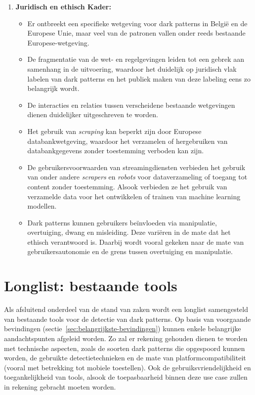 \begin{enumerate}
    \item \textbf{Juridisch en ethisch Kader:}
    \begin{itemize}
        \item Er ontbreekt een specifieke wetgeving voor dark patterns in België en de Europese Unie, maar veel van de patronen vallen onder reeds bestaande Europese-wetgeving.
        \item De fragmentatie van de wet- en regelgevingen leiden tot een gebrek aan samenhang in de uitvoering, waardoor het duidelijk op juridisch vlak labelen van dark patterns en het publiek maken van deze labeling eens zo belangrijk wordt.
        \item De interacties en relaties tussen verscheidene bestaande wetgevingen dienen duidelijker uitgeschreven te worden.
        \item Het gebruik van \textit{scraping} kan beperkt zijn door Europese databankwetgeving, waardoor het verzamelen of hergebruiken van databankgegevens zonder toestemming verboden kan zijn.
        \item De gebruikersvoorwaarden van streamingdiensten verbieden het gebruik van onder andere \textit{scrapers} en \textit{robots} voor dataverzameling of toegang tot content zonder toestemming. Alsook verbieden ze het gebruik van verzamelde data voor het ontwikkelen of trainen van machine learning modellen.
        \item Dark patterns kunnen gebruikers beïnvloeden via manipulatie, overtuiging, dwang en misleiding. Deze variëren in de mate dat het ethisch verantwoord is. Daarbij wordt vooral gekeken naar de mate van gebruikersautonomie en de grens tussen overtuiging en manipulatie.
    \end{itemize}
    
\end{enumerate}

\pagebreak

\section{Longlist: bestaande tools}
\label{sec:bestaande-tools}

\vspace{1em}

Als afsluitend onderdeel van de stand van zaken wordt een longlist samengesteld van bestaande tools voor de detectie van dark patterns. Op basis van voorgaande bevindingen (sectie~\ref{sec:belangrijkste-bevindingen}) kunnen enkele belangrijke aandachtspunten afgeleid worden. Zo zal er rekening gehouden dienen te worden met technische aspecten, zoals de soorten dark patterns die opgespoord kunnen worden, de gebruikte detectietechnieken en de mate van platformcompatibiliteit (vooral met betrekking tot mobiele toestellen). Ook de gebruiksvriendelijkheid en toegankelijkheid van tools, alsook de toepasbaarheid binnen deze use case zullen in rekening gebracht moeten worden.

